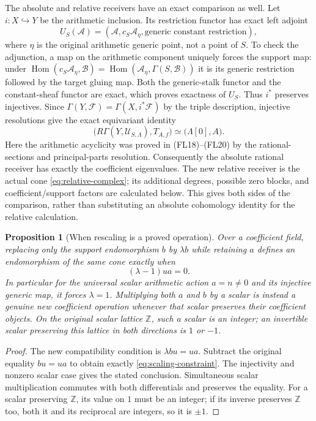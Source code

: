 \documentclass[11pt,a4paper]{article}
\newtheorem{proposition}[theorem]{Proposition}
\theoremstyle{definition}\newtheorem{definition}[theorem]{Definition}
\newcommand{\Z}{\mathbb Z}\newcommand{\Q}{\mathbb Q}
\begin{document}
The absolute and relative receivers have an exact comparison as
well. Let $i:X\hookrightarrow Y$ be the arithmetic inclusion. Its
restriction functor has exact left adjoint
\[
 U_S(\mathcal A)=
 (\mathcal A,c_S\mathcal A_\eta,\text{generic constant restriction}),
\]
where $\eta$ is the original arithmetic generic point, not a point
of $S$. To check the adjunction, a map on the arithmetic component
uniquely forces the support map: under
$\operatorname{Hom}(c_S\mathcal A_\eta,\mathcal B)
=\operatorname{Hom}(\mathcal A_\eta,\Gamma(S,\mathcal B))$
it is its generic restriction followed by the target gluing map.
Both the generic-stalk functor and the constant-sheaf functor are
exact, which proves exactness of $U_S$. Thus $i^*$ preserves
injectives. Since $\Gamma(Y,\mathcal F)=\Gamma(X,i^*\mathcal F)$
by the triple description, injective resolutions give the exact
equivariant identity
\[
 \bigl(R\Gamma(Y,\mathcal U_{S,\Lambda}),T_{A,f}\bigr)
 \simeq\bigl(\Lambda[0],A\bigr).
 \tag{SE7a}\label{eq:absolute-comparison}
\]
Here the arithmetic acyclicity was proved in (FL18)--(FL20) by the
rational-sections and principal-parts resolution. Consequently the
absolute rational receiver has exactly the coefficient eigenvalues.
The new relative receiver is the actual cone
\eqref{eq:relative-complex}; its additional degrees, possible zero
blocks, and coefficient/support factors are calculated below. This
gives both sides of the comparison, rather than substituting an
absolute cohomology identity for the relative calculation.

\begin{proposition}[When rescaling is a proved operation]
\label{prop:rescaling}
Over a coefficient field, replacing only the support endomorphism
$b$ by $\lambda b$ while retaining $a$ defines an endomorphism of the
same cone exactly when
\[
 (\lambda-1)ua=0.
 \tag{SE8}\label{eq:scaling-constraint}
\]
In particular for the universal scalar arithmetic action $a=n\ne0$
and its injective generic map, it forces $\lambda=1$.
Multiplying both $a$ and $b$ by a scalar is instead a genuine new
coefficient operation whenever that scalar preserves their coefficient
objects. On the original scalar lattice $\Z$, such a scalar is an
integer; an invertible scalar preserving this lattice in both
directions is $1$ or $-1$.
\end{proposition}
\begin{proof}
The new compatibility condition is $\lambda bu=ua$.
Subtract the original equality $bu=ua$ to obtain exactly
\eqref{eq:scaling-constraint}. The injectivity and nonzero scalar
case gives the stated conclusion. Simultaneous scalar multiplication
commutes with both differentials and preserves the equality.
For a scalar preserving $\Z$, its value on $1$ must be an integer;
if its inverse preserves $\Z$ too, both it and its reciprocal are
integers, so it is $\pm1$.
\end{proof}
\end{document}
